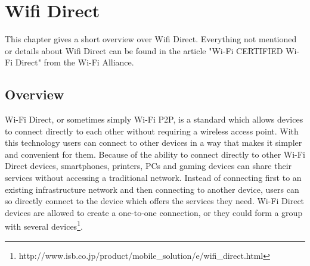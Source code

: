 \chapter{Wifi Direct}
\label{cha:WifiDirect}
This chapter gives a short overview over Wifi Direct. Everything not mentioned or details about Wifi Direct can be found in the article "Wi-Fi CERTIFIED Wi-Fi Direct" from the Wi-Fi Alliance\cite{wifialliance}.

\section{Overview}
\label{sec:Overview}
Wi-Fi Direct, or sometimes simply Wi-Fi P2P, is a standard which allows devices to connect directly to each other without requiring a wireless access point. With this technology users can connect to other devices in a way that makes it simpler and convenient for them. Because of the ability to connect directly to other Wi-Fi Direct devices, smartphones, printers, PCs and gaming devices can share their services without accessing a traditional network. Instead of connecting first to an existing infrastructure network and then connecting to another device, users can so directly connect to the device which offers the services they need. Wi-Fi Direct devices are allowed to create a one-to-one connection, or they could form a group with several devices\footnote{http://www.isb.co.jp/product/mobile\_solution/e/wifi\_direct.html}.\newline

